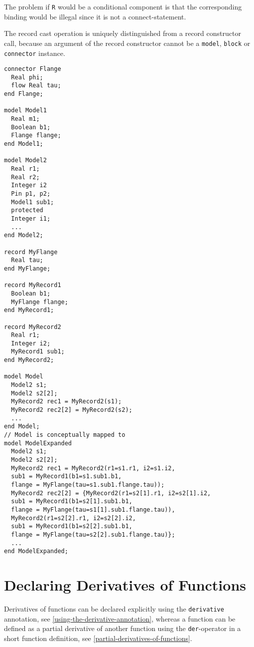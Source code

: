 \begin{nonnormative}
The problem if \lstinline!R! would be a conditional component is that the corresponding binding would be illegal since it is not a
connect-statement.
\end{nonnormative}

\begin{nonnormative}
The record cast operation is uniquely distinguished from a record constructor call, because an argument of the record constructor cannot
be a \lstinline!model!, \lstinline!block! or \lstinline!connector! instance.
\end{nonnormative}

\begin{example}
\begin{lstlisting}[language=modelica]
connector Flange
  Real phi;
  flow Real tau;
end Flange;

model Model1
  Real m1;
  Boolean b1;
  Flange flange;
end Model1;

model Model2
  Real r1;
  Real r2;
  Integer i2
  Pin p1, p2;
  Model1 sub1;
  protected
  Integer i1;
  ...
end Model2;

record MyFlange
  Real tau;
end MyFlange;

record MyRecord1
  Boolean b1;
  MyFlange flange;
end MyRecord1;

record MyRecord2
  Real r1;
  Integer i2;
  MyRecord1 sub1;
end MyRecord2;

model Model
  Model2 s1;
  Model2 s2[2];
  MyRecord2 rec1 = MyRecord2(s1);
  MyRecord2 rec2[2] = MyRecord2(s2);
  ...
end Model;
// Model is conceptually mapped to
model ModelExpanded
  Model2 s1;
  Model2 s2[2];
  MyRecord2 rec1 = MyRecord2(r1=s1.r1, i2=s1.i2,
  sub1 = MyRecord1(b1=s1.sub1.b1,
  flange = MyFlange(tau=s1.sub1.flange.tau));
  MyRecord2 rec2[2] = {MyRecord2(r1=s2[1].r1, i2=s2[1].i2,
  sub1 = MyRecord1(b1=s2[1].sub1.b1,
  flange = MyFlange(tau=s1[1].sub1.flange.tau)),
  MyRecord2(r1=s2[2].r1, i2=s2[2].i2,
  sub1 = MyRecord1(b1=s2[2].sub1.b1,
  flange = MyFlange(tau=s2[2].sub1.flange.tau)};
  ...
end ModelExpanded;
\end{lstlisting}
\end{example}

\section{Declaring Derivatives of Functions}\label{declaring-derivatives-of-functions}

Derivatives of functions can be declared explicitly using the \lstinline!derivative!
annotation, see \cref{using-the-derivative-annotation}, whereas a function can be defined as a
partial derivative of another function using the \lstinline!der!-operator in a short
function definition, see \cref{partial-derivatives-of-functions}.

